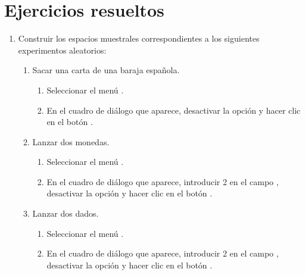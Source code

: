 \section{Ejercicios resueltos}
\begin{enumerate}[leftmargin=*] 
\item Construir los espacios muestrales correspondientes a los siguientes experimentos aleatorios:
\begin{enumerate}
\item Sacar una carta de una baraja española.
\begin{indicacion}{
\begin{enumerate}
\item Seleccionar el menú .
\item En el cuadro de diálogo que aparece, desactivar la opción  y hacer clic en el botón . 
\end{enumerate}
}
\end{indicacion}
\item Lanzar dos monedas.
\begin{indicacion}{
\begin{enumerate}
\item Seleccionar el menú .
\item En el cuadro de diálogo que aparece, introducir 2 en el campo , desactivar la opción  y hacer clic en el botón .
\end{enumerate}
}
\end{indicacion}

\item Lanzar dos dados.
\begin{indicacion}{
\begin{enumerate}
\item Seleccionar el menú .
\item En el cuadro de diálogo que aparece, introducir 2 en el campo , desactivar la opción  y hacer clic en el botón .
\end{enumerate}
}
\end{indicacion}


\end{enumerate}
\end{enumerate}
